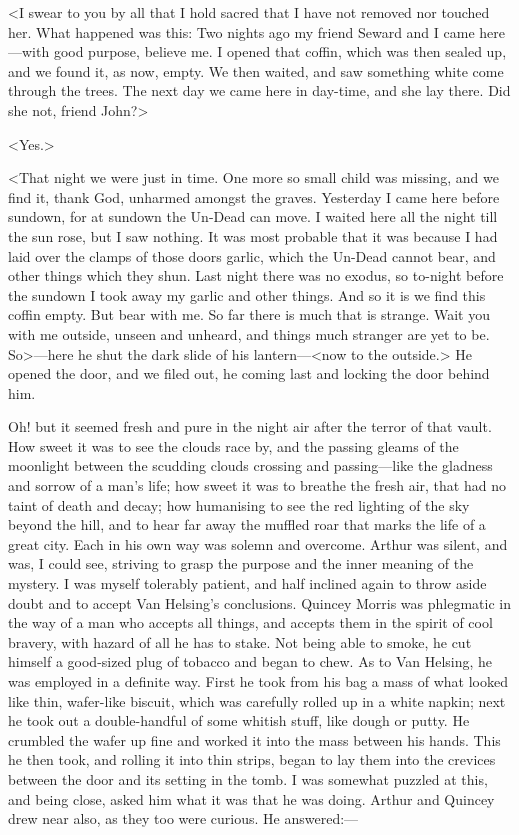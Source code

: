 <I swear to you by all that I hold sacred that I have not removed nor touched her. What happened was this: Two nights ago my friend Seward and I came here—with good purpose, believe me. I opened that coffin, which was then sealed up, and we found it, as now, empty. We then waited, and saw something white come through the trees. The next day we came here in day-time, and she lay there. Did she not, friend John?>

<Yes.>

<That night we were just in time. One more so small child was missing, and we find it, thank God, unharmed amongst the graves. Yesterday I came here before sundown, for at sundown the Un-Dead can move. I waited here all the night till the sun rose, but I saw nothing. It was most probable that it was because I had laid over the clamps of those doors garlic, which the Un-Dead cannot bear, and other things which they shun. Last night there was no exodus, so to-night before the sundown I took away my garlic and other things. And so it is we find this coffin empty. But bear with me. So far there is much that is strange. Wait you with me outside, unseen and unheard, and things much stranger are yet to be. So>—here he shut the dark slide of his lantern—<now to the outside.> He opened the door, and we filed out, he coming last and locking the door behind him.

Oh! but it seemed fresh and pure in the night air after the terror of that vault. How sweet it was to see the clouds race by, and the passing gleams of the moonlight between the scudding clouds crossing and passing—like the gladness and sorrow of a man's life; how sweet it was to breathe the fresh air, that had no taint of death and decay; how humanising to see the red lighting of the sky beyond the hill, and to hear far away the muffled roar that marks the life of a great city. Each in his own way was solemn and overcome. Arthur was silent, and was, I could see, striving to grasp the purpose and the inner meaning of the mystery. I was myself tolerably patient, and half inclined again to throw aside doubt and to accept Van Helsing's conclusions. Quincey Morris was phlegmatic in the way of a man who accepts all things, and accepts them in the spirit of cool bravery, with hazard of all he has to stake. Not being able to smoke, he cut himself a good-sized plug of tobacco and began to chew. As to Van Helsing, he was employed in a definite way. First he took from his bag a mass of what looked like thin, wafer-like biscuit, which was carefully rolled up in a white napkin; next he took out a double-handful of some whitish stuff, like dough or putty. He crumbled the wafer up fine and worked it into the mass between his hands. This he then took, and rolling it into thin strips, began to lay them into the crevices between the door and its setting in the tomb. I was somewhat puzzled at this, and being close, asked him what it was that he was doing. Arthur and Quincey drew near also, as they too were curious. He answered:—

